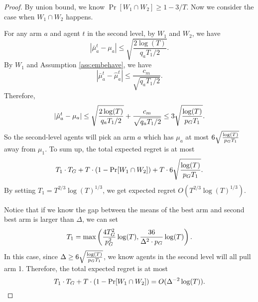 \begin{proof}
By union bound, we know $\Pr[W_1 \cap W_2] \geq 1 - 3/T$. Now we consider the case when $W_1 \cap W_2$ happens. 

For any arm $a$ and agent $t$ in the second level, by $W_1$ and $W_2$, we have
\[
|\bar{\mu}^t_a - \mu_a| \leq \sqrt{\frac{2\log(T)}{q_aT_1 /2}}.
\]
By $W_1$ and Assumption \ref{ass:embehave}, we have
\[
|\bar{\mu}^t_a - \hat{\mu}^t_a| \leq \frac{c_m}{\sqrt{q_aT_1/2}}.
\]
Therefore,
\[
|\hat{\mu}^t_a - \mu_a|\leq \sqrt{\frac{2\log(T)}{q_aT_1 /2}}+\frac{c_m}{\sqrt{q_aT_1/2}} \leq 3 \sqrt{\frac{\log(T)}{p_G T_1 }}.
\]
So the second-level agents will pick an arm $a$ which has $\mu_a$ at most $6 \sqrt{\frac{\log(T)}{p_G T_1 }}$ away from $\mu_1$. To sum up, the total expected regret is at most 
\[
T_1 \cdot T_G + T \cdot (1-\Pr[W_1 \cap W_2]) + T \cdot  6 \sqrt{\frac{\log(T)}{p_G T_1 }}.
\]
By setting $T_1 = T^{2/3}\log(T)^{1/3}$, we get expected regret $O(T^{2/3}\log(T)^{1/3})$.

Notice that if we know the gap between the means of the best arm and second best arm is larger than $\Delta$, we can set 
\[
T_1 = \max\left( \frac{4T_G^2}{p_G^2}\log(T), \frac{36 }{\Delta^2 \cdot p_G} \log(T) \right).
\]
In this case, since $\Delta \geq 6 \sqrt{\frac{\log(T)}{p_G T_1 }}$, we know agents in the second level will all pull arm 1. Therefore, the total expected regret is at most
\[
T_1 \cdot T_G + T \cdot (1- \Pr[W_1 \cap W_2]) = O(\Delta^{-2} \log(T)).
\]
\end{proof}